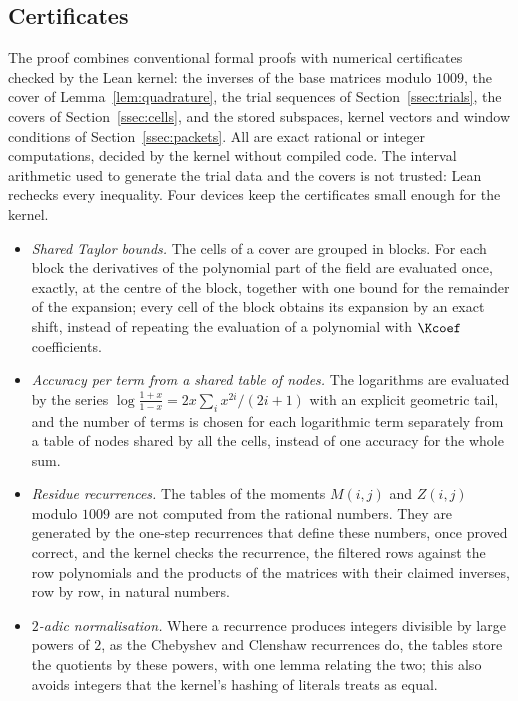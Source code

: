 \subsection{Certificates}
The proof combines conventional formal proofs with numerical certificates checked by the Lean kernel:
the inverses of the base matrices modulo $1009$, the cover of Lemma~\ref{lem:quadrature}, the trial
sequences of Section~\ref{ssec:trials}, the covers of Section~\ref{ssec:cells}, and the stored subspaces,
kernel vectors and window conditions of Section~\ref{ssec:packets}. All are exact rational or
integer computations, decided by the kernel without compiled code. The interval arithmetic used to
generate the trial data and the covers \cite{Arb} is not trusted: Lean rechecks every inequality. Four
devices keep the certificates small enough for the kernel.
\begin{itemize}
\item \emph{Shared Taylor bounds.} The cells of a cover are grouped in blocks. For each block the
derivatives of the polynomial part of the field are evaluated once, exactly, at the centre of the block,
together with one bound for the remainder of the expansion; every cell of the block obtains its expansion
by an exact shift, instead of repeating the evaluation of a polynomial with $\Kcoef$ coefficients.
\item \emph{Accuracy per term from a shared table of nodes.} The logarithms are evaluated by the series
$\log\frac{1+x}{1-x}=2x\sum_i x^{2i}/(2i+1)$ with an explicit geometric tail, and the number of terms is
chosen for each logarithmic term separately from a table of nodes shared by all the cells, instead of
one accuracy for the whole sum.
\item \emph{Residue recurrences.} The tables of the moments $M(i,j)$ and $Z(i,j)$ modulo $1009$ are not
computed from the rational numbers. They are generated by the one-step recurrences that define these
numbers, once proved correct, and the kernel checks the recurrence, the filtered rows against the
row polynomials and the products of the matrices with their claimed inverses, row by row, in natural
numbers.
\item \emph{$2$-adic normalisation.} Where a recurrence produces integers divisible by large powers of
$2$, as the Chebyshev and Clenshaw recurrences do, the tables store the quotients by these powers, with
one lemma relating the two; this also avoids integers that the kernel's hashing of literals treats as
equal.
\end{itemize}

